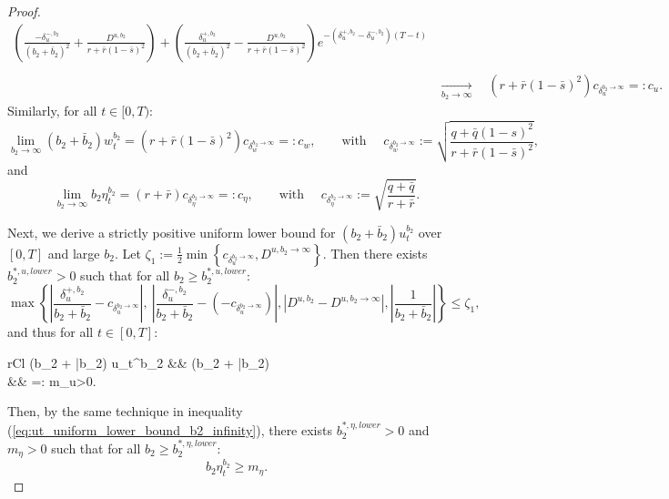 \documentclass[11pt]{article}
\begin{document}
\begin{proof}
\begin{equation*}
\begin{split}
		{\displaystyle \left(\frac{- \delta^{-,b_2}_u}{(b_2 + \bar{b}_2)^2} + \frac{D^{u,b_2}}{r + \bar{r}(1-\bar{s})^2} \right) + \left(\frac{\delta^{+,b_2}_u}{(b_2 + \bar{b}_2)^2} - \frac{D^{u,b_2} }{r + \bar{r}(1-\bar{s})^2} \right)e^{- (\delta^{+,b_2}_u - \delta^{-,b_2}_u)(T-t)}  } \nonumber \\
		\\
		&\xrightarrow[b_2 \to \infty]{} \quad (r + \bar{r}(1-\bar{s})^2) c_{\delta_u^{b_2 \to \infty}}  =: c_u.
	\end{split}
	\end{equation*}
	Similarly, for all $t \in [0,T)$:
	$$\lim_{b_2 \to \infty} (b_2 + \bar{b}_2) w_t^{b_2} =  (r + \bar{r}(1-\bar{s})^2) c_{\delta_w^{b_2 \to \infty}} =: c_w,\qquad \text{with } \quad c_{\delta_w^{b_2 \to \infty}} := \sqrt{ \frac{q + \bar{q}(1-s)^2}{r + \bar{r}(1-\bar{s})^2} },$$
	and
	$$ \lim_{b_2 \to \infty}b_2 \eta_t^{b_2} = (r + \bar{r}) c_{\delta_{\eta}^{b_2 \to \infty}} =: c_\eta, \qquad \text{with } \quad c_{\delta_\eta^{b_2 \to \infty}} := \sqrt{ \frac{q + \bar{q}}{r +\bar{r}} }.$$
	
	Next, we derive a strictly positive uniform lower bound for $(b_2 + \bar{b}_2) u_t^{b_2}$ over $[0,T]$ and large $b_2$. Let $\zeta_1 :=\frac{1}{2} \min \left\{ c_{\delta_u^{b_2 \to \infty}}, D^{u,b_2 \to \infty} \right\}$. Then there exists $b_2^{*,u,lower}>0$ such that for all $b_2 \geq b_2^{*,u,lower}$:
	$$ 
	\max \left\{  \left\vert \frac{\delta_u^{+,b_2}}{b_2 + \bar{b}_2}  - c_{\delta_u^{b_2 \to \infty}} \right\vert, \   \left\vert \frac{\delta_u^{-,b_2}}{b_2 + \bar{b}_2}  - \left(-c_{\delta_u^{b_2 \to \infty}}\right) \right\vert, \left\vert D^{u,b_2} - D^{u,b_2\to \infty} \right\vert,  \left\vert \frac{1}{b_2 + \bar{b}_2} \right\vert  \right\} \leq \zeta_1,
	$$ 
	and thus for all $t \in [0,T]$:
	\begin{IEEEeqnarray}{rCl}
		(b_2 + \bar{b}_2) u_t^{b_2} &\geq&  (b_2 + \bar{b}_2)  \nonumber \\
		&\geq&  =: m_u>0.
	\label{eq:ut_uniform_lower_bound_b2_infinity}
	\end{IEEEeqnarray}
	Then, by the same technique in inequality (\ref{eq:ut_uniform_lower_bound_b2_infinity}), there exists $b_2^{*,\eta, lower} > 0$ and $m_\eta >0$ such that for all $b_2 \geq b_2^{*,\eta,lower}$:
	\begin{equation}
	   b_2 \eta_t^{b_2} \geq m_\eta.
	\label{eq:eta_t_uniform_lower_bound_b2_infinity}
	\end{equation}


\end{proof}
\end{document}
